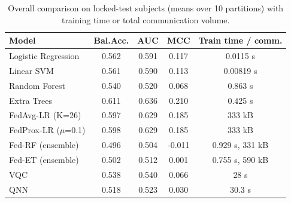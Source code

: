 \begin{table}[!t]\centering\caption{Overall comparison on locked-test subjects (means over 10 partitions) with training time or total communication volume.}\label{tab:overall}\scriptsize\setlength{\tabcolsep}{3pt}\begin{tabular}{lcccc}\toprule Model & Bal.Acc. & AUC & MCC & Train time / comm.\\\midrule
Logistic Regression & 0.562 & 0.591 & 0.117 & 0.0115 s\\
Linear SVM & 0.561 & 0.590 & 0.113 & 0.00819 s\\
Random Forest & 0.540 & 0.520 & 0.068 & 0.863 s\\
Extra Trees & 0.611 & 0.636 & 0.210 & 0.425 s\\
FedAvg-LR (K=26) & 0.597 & 0.629 & 0.185 & 333 kB\\
FedProx-LR ($\mu$=0.1) & 0.598 & 0.629 & 0.185 & 333 kB\\
Fed-RF (ensemble) & 0.496 & 0.504 & -0.011 & 0.929 s, 331 kB\\
Fed-ET (ensemble) & 0.502 & 0.512 & 0.001 & 0.755 s, 590 kB\\
VQC & 0.538 & 0.540 & 0.066 & 28 s\\
QNN & 0.518 & 0.523 & 0.030 & 30.3 s\\
\bottomrule\end{tabular}\end{table}
